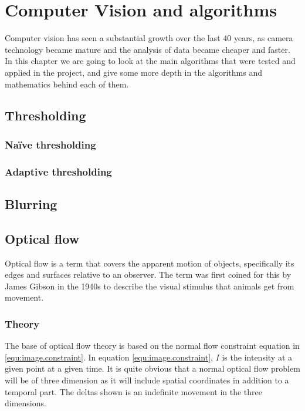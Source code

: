 
\chapter{Computer Vision and algorithms}

Computer vision has seen a substantial growth over the last 40 years, as camera technology became mature 
and the analysis of data became cheaper and faster. In this chapter we are going to look at the main algorithms 
that were tested and applied in the project, and give some more depth in the algorithms and mathematics behind each of them.

\section{Thresholding}

\subsection{Naïve thresholding}

\subsection{Adaptive thresholding}


\section{Blurring}



\section{Optical flow}
Optical flow is a term that covers the apparent motion of objects, specifically its edges and surfaces 
relative to an observer. The term was first coined for this by James Gibson in the 1940s 
to describe the visual stimulus that animals get from movement\citet{gibson50}.


\subsection{Theory}
The base of optical flow theory is based on the normal flow constraint equation in \eqref{equ:image.constraint}. In equation \eqref{equ:image.constraint}, $I$ is the intensity
at a given point at a given time. It is quite obvious that a normal optical flow problem will be of three dimension as it will include spatial coordinates in addition
to a temporal part. The deltas shown is an indefinite movement in the three dimensions.



